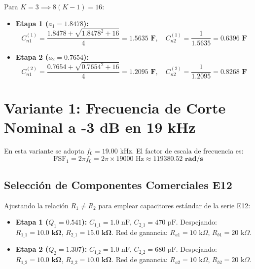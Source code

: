 \documentclass[a4paper,11pt]{article}
\begin{document}
Para $K = 3 \implies 8(K - 1) = 16$:
\begin{itemize}
    \item \textbf{Etapa 1 ($a_1 = 1.8478$):}
    \begin{equation}
    C_{n1}^{(1)} = \frac{1.8478 + \sqrt{1.8478^2 + 16}}{4} = \mathbf{1.5635\text{ F}}, \quad C_{n2}^{(1)} = \frac{1}{1.5635} = \mathbf{0.6396\text{ F}}
    \end{equation}
    \item \textbf{Etapa 2 ($a_2 = 0.7654$):}
    \begin{equation}
    C_{n1}^{(2)} = \frac{0.7654 + \sqrt{0.7654^2 + 16}}{4} = \mathbf{1.2095\text{ F}}, \quad C_{n2}^{(2)} = \frac{1}{1.2095} = \mathbf{0.8268\text{ F}}
    \end{equation}
\end{itemize}

\section{Variante 1: Frecuencia de Corte Nominal a -3 dB en 19 kHz}

En esta variante se adopta $f_0 = 19.00\text{ kHz}$. El factor de escala de frecuencia es:
\begin{equation}
\text{FSF}_1 = 2\pi f_0 = 2\pi \times 19000\text{ Hz} \approx \mathbf{119380.52\text{ rad/s}}
\end{equation}

\subsection{Selección de Componentes Comerciales E12}
Ajustando la relación $R_1 \neq R_2$ para emplear capacitores estándar de la serie E12:
\begin{itemize}
    \item \textbf{Etapa 1 ($Q_1 = 0.541$):} $C_{1\_1} = 1.0\text{ nF}$, $C_{2\_1} = 470\text{ pF}$. 
    Despejando: $R_{1\_1} = \mathbf{10.0\text{ k}\Omega}$, $R_{2\_1} = \mathbf{15.0\text{ k}\Omega}$. Red de ganancia: $R_{a1} = 10\text{ k}\Omega$, $R_{b1} = 20\text{ k}\Omega$.
    \item \textbf{Etapa 2 ($Q_2 = 1.307$):} $C_{1\_2} = 1.0\text{ nF}$, $C_{2\_2} = 680\text{ pF}$. 
    Despejando: $R_{1\_2} = \mathbf{10.0\text{ k}\Omega}$, $R_{2\_2} = \mathbf{10.0\text{ k}\Omega}$. Red de ganancia: $R_{a2} = 10\text{ k}\Omega$, $R_{b2} = 20\text{ k}\Omega$.
\end{itemize}
\end{document}
